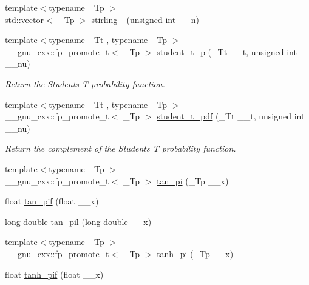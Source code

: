 \begin{DoxyCompactItemize}
\item 
{\footnotesize template$<$typename \+\_\+\+Tp $>$ }\\std\+::vector$<$ \+\_\+\+Tp $>$ \hyperlink{group__mathsf__gnu_ga6a2386b3e0940935f10a163baa925656}{stirling\+\_} (unsigned int \+\_\+\+\_\+n)
\item 
{\footnotesize template$<$typename \+\_\+\+Tt , typename \+\_\+\+Tp $>$ }\\\+\_\+\+\_\+gnu\+\_\+cxx\+::fp\+\_\+promote\+\_\+t$<$ \+\_\+\+Tp $>$ \hyperlink{group__mathsf__gnu_ga5a84386b009ac57a726d5d0314fdf7ce}{student\+\_\+t\+\_\+p} (\+\_\+\+Tt \+\_\+\+\_\+t, unsigned int \+\_\+\+\_\+nu)
\begin{DoxyCompactList}\small\item\em Return the Students T probability function. \end{DoxyCompactList}\item 
{\footnotesize template$<$typename \+\_\+\+Tt , typename \+\_\+\+Tp $>$ }\\\+\_\+\+\_\+gnu\+\_\+cxx\+::fp\+\_\+promote\+\_\+t$<$ \+\_\+\+Tp $>$ \hyperlink{group__mathsf__gnu_ga95a4c03cf0a8104e9a15a35acfe5fb3a}{student\+\_\+t\+\_\+pdf} (\+\_\+\+Tt \+\_\+\+\_\+t, unsigned int \+\_\+\+\_\+nu)
\begin{DoxyCompactList}\small\item\em Return the complement of the Students T probability function. \end{DoxyCompactList}\item 
{\footnotesize template$<$typename \+\_\+\+Tp $>$ }\\\+\_\+\+\_\+gnu\+\_\+cxx\+::fp\+\_\+promote\+\_\+t$<$ \+\_\+\+Tp $>$ \hyperlink{group__mathsf__gnu_ga12855bd62fe6a955ef0d1d5e92c85ba9}{tan\+\_\+pi} (\+\_\+\+Tp \+\_\+\+\_\+x)
\item 
float \hyperlink{group__mathsf__gnu_gaab32e2d76da811451e84232320ddf80c}{tan\+\_\+pif} (float \+\_\+\+\_\+x)
\item 
long double \hyperlink{group__mathsf__gnu_ga3546906a5bb8f128c893dddef72e2f20}{tan\+\_\+pil} (long double \+\_\+\+\_\+x)
\item 
{\footnotesize template$<$typename \+\_\+\+Tp $>$ }\\\+\_\+\+\_\+gnu\+\_\+cxx\+::fp\+\_\+promote\+\_\+t$<$ \+\_\+\+Tp $>$ \hyperlink{group__mathsf__gnu_ga8729ffd5acf3266315e9dac1b5a9b3a6}{tanh\+\_\+pi} (\+\_\+\+Tp \+\_\+\+\_\+x)
\item 
float \hyperlink{group__mathsf__gnu_gab6cbfb582127f997ad9a198903d08889}{tanh\+\_\+pif} (float \+\_\+\+\_\+x)

\end{DoxyCompactItemize}

